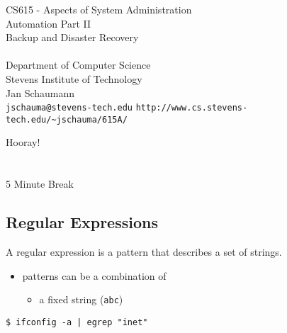 \documentclass[xga]{xdvislides}
\begin{document}
\setfontphv

\lhead{\slidetitle}                               %
\cfoot{\relax}                               %
\rfoot{\Gray{\today}}

\vspace*{\fill}
\begin{center}
	\Hugesize
		CS615 - Aspects of System Administration\\ [1em]
		Automation Part II \\ [1em]
		Backup and Disaster Recovery \\ [1em]
	\hspace*{5mm}\blueline\\ [1em]
	\Normalsize
		Department of Computer Science\\
		Stevens Institute of Technology\\
		Jan Schaumann\\
		\verb+jschauma@stevens-tech.edu+
		\verb+http://www.cs.stevens-tech.edu/~jschauma/615A/+
\end{center}
\vspace*{\fill}

\newpage
\vspace*{\fill}
\begin{center}
    \Hugesize
        Hooray! \\ [1em]
    \hspace*{5mm}
    \blueline\\
    \hspace*{5mm}\\
        5 Minute Break
\end{center}
\vspace*{\fill}

\subsection{Regular Expressions}
A regular expression is a pattern that describes a set of strings. \\

\begin{itemize}
	\item patterns can be a combination of
		\begin{itemize}
			\item a fixed string (\verb+abc+)
		\end{itemize}
\end{itemize}
\vspace{.5in}
\begin{verbatim}
$ ifconfig -a | egrep "inet"
\end{verbatim}
\end{document}
